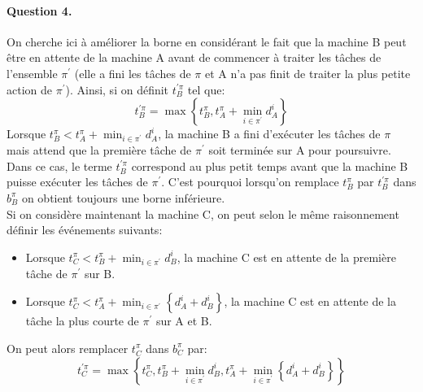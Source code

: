 \documentclass[a4paper, 10pt]{article}
\begin{document}
		\paragraph{Question 4.}{On cherche ici à améliorer la borne en considérant le fait que la machine B peut être en attente de la machine A avant de commencer à traiter les tâches de l'ensemble $\pi^\prime$ (elle a fini les tâches de $\pi$ et A n'a pas finit de traiter la plus petite action de $\pi^\prime$). Ainsi, si on définit $t^{\prime\pi}_B$ tel que:
		\begin{equation*}
			t^{\prime\pi}_B = \max \left\{ t^{\pi}_B, t^{\pi}_A + \min_{i \in \pi^\prime} d^i_A \right\}
		\end{equation*}
		Lorsque $t^{\pi}_B < t^{\pi}_A + \min_{i \in \pi^\prime} d^i_A$, la machine B a fini d'exécuter les tâches de $\pi$ mais attend que la première tâche de $\pi^\prime$ soit terminée sur A pour poursuivre. Dans ce cas, le terme $t^{\prime\pi}_B$ correspond au plus petit temps avant que la machine B puisse exécuter les tâches de $\pi^\prime$. C'est pourquoi lorsqu'on remplace $t^\pi_B$ par $t^{\prime\pi}_B$ dans $b^\pi_B$ on obtient toujours une borne inférieure.\\
		
		Si on considère maintenant la machine C, on peut selon le même raisonnement définir les événements suivants:
		\begin{itemize}
			\item Lorsque $t^{\pi}_C < t^{\pi}_B + \min_{i \in \pi^\prime} d^i_B$, la machine C est en attente de la première tâche de $\pi^\prime$ sur B.
			\item Lorsque $t^\pi_C < t^\pi_A + \min_{i \in \pi^\prime} \left\{ d^i_A + d^i_B \right\}$, la machine C est en attente de la tâche la plus courte de $\pi^\prime$ sur A et B.
		\end{itemize}
		
		On peut alors remplacer $t^\pi_C$ dans $b^\pi_C$ par:
		\begin{equation*}
			t^{\prime\pi}_C = \max \left\{ t^{\pi}_C, t^{\pi}_B + \min_{i \in \pi^\prime} d^i_B,  t^\pi_A + \min_{i \in \pi^\prime} \left\{ d^i_A + d^i_B \right\} \right\}
		\end{equation*}
		}
		
\end{document}
